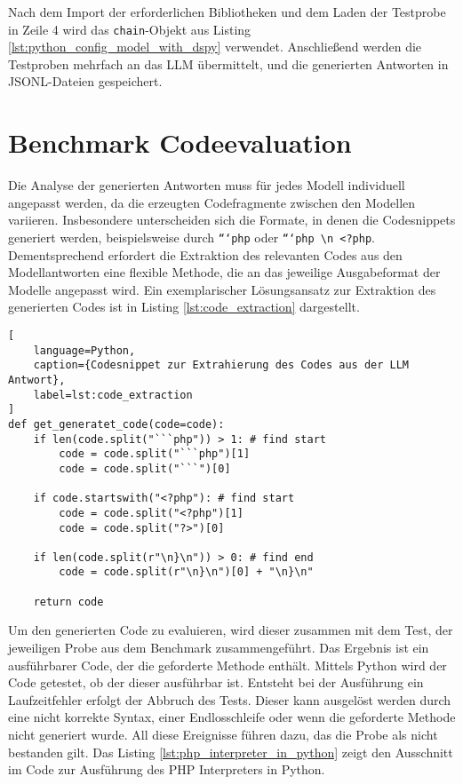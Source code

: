 Nach dem Import der erforderlichen Bibliotheken und dem Laden der Testprobe in Zeile 4 wird das \texttt{chain}-Objekt aus Listing \ref{lst:python_config_model_with_dspy} verwendet. Anschließend werden die Testproben mehrfach an das LLM übermittelt, und die generierten Antworten in JSONL-Dateien gespeichert.




\section{Benchmark Codeevaluation}\label{sec:benchmark_evaluation}
Die Analyse der generierten Antworten muss für jedes Modell individuell angepasst werden, da die erzeugten Codefragmente zwischen den Modellen variieren. Insbesondere unterscheiden sich die Formate, in denen die Codesnippets generiert werden, beispielsweise durch \texttt{```php} oder \texttt{```php \textbackslash n <?php}. Dementsprechend erfordert die Extraktion des relevanten Codes aus den Modellantworten eine flexible Methode, die an das jeweilige Ausgabeformat der Modelle angepasst wird. Ein exemplarischer Lösungsansatz zur Extraktion des generierten Codes ist in Listing \ref{lst:code_extraction} dargestellt.\vspace{0.2cm}

\begin{lstlisting}[
	language=Python,
	caption={Codesnippet zur Extrahierung des Codes aus der LLM Antwort},
	label=lst:code_extraction
]
def get_generatet_code(code=code):
    if len(code.split("```php")) > 1: # find start
        code = code.split("```php")[1]
        code = code.split("```")[0]

    if code.startswith("<?php"): # find start
        code = code.split("<?php")[1]
        code = code.split("?>")[0]

    if len(code.split(r"\n}\n")) > 0: # find end
        code = code.split(r"\n}\n")[0] + "\n}\n"

    return code
\end{lstlisting}

Um den generierten Code zu evaluieren, wird dieser zusammen mit dem Test, der jeweiligen Probe aus dem Benchmark zusammengeführt. Das Ergebnis ist ein ausführbarer Code, der die geforderte Methode enthält. Mittels Python wird der Code getestet, ob der dieser ausführbar ist. Entsteht bei der Ausführung ein Laufzeitfehler erfolgt der Abbruch des Tests. Dieser kann ausgelöst werden durch eine nicht korrekte Syntax, einer Endlosschleife oder wenn die geforderte Methode nicht generiert wurde. All diese Ereignisse führen dazu, das die Probe als nicht bestanden gilt. Das Listing \ref{lst:php_interpreter_in_python} zeigt den Ausschnitt im Code zur Ausführung des PHP Interpreters in Python.\vspace{0.2cm}

